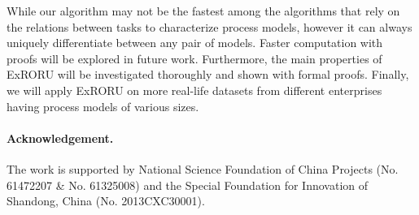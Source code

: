 \documentclass{llncs}
\begin{document}
While our algorithm may not be the fastest among the algorithms that rely on the relations between tasks to characterize process models, however it can always uniquely differentiate between any pair of models. Faster computation with proofs will be explored in future work. Furthermore, the main properties of ExRORU will be investigated thoroughly and shown with formal proofs. Finally, we will apply ExRORU on more real-life datasets from different enterprises having process models of various sizes.

\paragraph{\textbf{Acknowledgement.}} The work is supported by National Science Foundation of
China Projects (No. 61472207 \& No. 61325008) and the Special Foundation for Innovation of
Shandong, China (No. 2013CXC30001).



\end{document}
